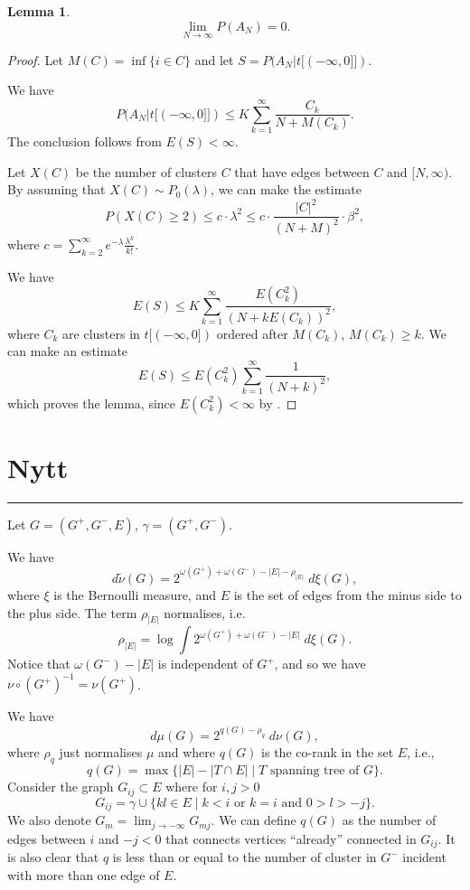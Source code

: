 \documentclass[11pt, a4paper, oneside]{scrartcl}
\newtheorem{lem}[thm]{Lemma}
\theoremstyle{definition}
\theoremstyle{remark}
\providecommand{\tl}{\tilde}
\begin{document}
\begin{lem}
$$\lim_{N\to \infty} P(A_N)=0.$$
\end{lem}

\begin{proof}
  Let $M(C)=\inf \{i\in C \}$ and let $S=P(A_N |t[(-\infty, 0]])$.

  We have
$$P(A_N|t[(-\infty, 0]])\leq K \sum_{k=1}^\infty \frac{C_k}{N+M(C_k)}.$$
The conclusion follows from $E(S)<\infty$.

Let $X(C)$ be the number of clusters $C$ that have edges between $C$ and
$[N,\infty)$. By assuming that $X(C)\sim P_0(\lambda)$, we can make the estimate
$$P(X(C)\geq 2)\leq c\cdot \lambda^2 \leq c\cdot \frac{|C|^2}{(N+M)^2}\cdot \beta^2,$$
where $c=\sum_{k=2}^\infty e^{-\lambda} \frac{\lambda^k}{k!}$.

We have
$$E(S) \leq K \sum_{k=1}^\infty \frac{E(C_k^2)}{(N+k E(C_k))^2},$$
where $C_k$ are clusters in $t[(-\infty, 0])$ ordered after $M(C_k)$,
$M(C_k)\geq k$. We can make an estimate
$$E(S)\leq E(C_k^2)\sum _{k=1}^\infty \frac{1}{(N+k)^2},$$
which proves the lemma, since $E(C_k^2)<\infty$ by
\cite{aizenmanUniquenessInfiniteCluster1987}.

\end{proof}





\section{Nytt}
\hrule

Let $G=(G^+, G^- , E)$, $\gamma=(G^+,G^-)$.

We have
$$d\tl\nu(G)=2^{\omega(G^+)+\omega(G^-)-|E|-\rho_{|E|}}\; d\xi(G),$$
where $\xi$ is the Bernoulli measure, and $E$ is the set of edges from the minus side to the plus side. The term $\rho_{|E|}$ normalises, i.e.\
\[
\rho_{|E|} =
\log \int 2^{\omega(G^+)+\omega(G^-)-|E|}\; d\xi(G).
\]
Notice that
$\omega(G^-)-|E|$ is independent of $G^+$, and so we have $\nu\circ (G^+)^{-1}=\nu(G^+)$.

We have
$$d\mu(G)=2^{q(G)-\rho_q}\; d\nu(G),$$
where $\rho_q$ just normalises $\mu$ and where $q(G)$ is the co-rank in the set $E$, i.e.,
$$
q(G)=\max \{|E|-|T\cap E|\mid \text{$T$ spanning tree of $G$} \}.
$$
Consider the graph $G_{ij}\subset E$ where for $i,j>0$
$$ G_{ij} =  \gamma \cup
\{ kl\in E \mid k < i \text{ or } k=i \text{ and } 0>l>-j \}.
$$
We also denote $G_m = \lim_{j\to-\infty} G_{mj}$.
We can define $q(G)$ as the number of edges between $i$ and $-j<0$ that connects vertices ``already'' connected in $G_{ij}$.
It is also clear that $q$ is less than or equal to the number of
cluster in $G^-$ incident with more than one edge of $E$.
\end{document}
